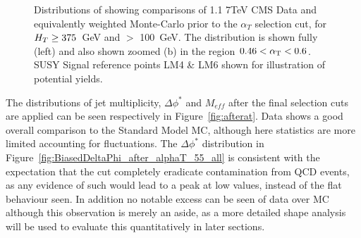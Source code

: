 \begin{figure}[htpb]
\centering
\begin{minipage}[b]{1.\textwidth}
\centering
{}
\hspace{0.2cm}
     \end{minipage}
    \caption{\label{fig:preselplotb}Distributions of \alt showing comparisons of 1.1  7TeV CMS Data and equivalently weighted Monte-Carlo prior to the $\alpha_{T}$ selection cut, for $H_{T}  \geq 375$~GeV and \MHT $>$ 100~GeV. The \alt distribution is shown fully (left) and also shown zoomed (b) in the region $0.46 < \alpha_{\text{T}} < 0.6$. SUSY Signal reference points LM4 \& LM6 shown for illustration of potential yields.}
\end{figure}


The distributions of jet multiplicity, $\Delta \phi^{*}$ and $M_{eff}$ after the final selection cuts are applied can be seen respectively in Figure~\ref{fig:afterat}. Data shows a good overall comparison to the Standard Model MC, although here statistics are more limited accounting for fluctuations. The $\Delta \phi^{*}$ distribution in Figure~\ref{fig:BiasedDeltaPhi_after_alphaT_55_all} is consistent with the expectation that the \alt cut completely eradicate contamination from QCD events, as any evidence of such would lead to a peak at low values, instead of the flat behaviour seen. In addition no notable excess can be seen of data over MC although this observation is merely an aside, as a more detailed shape analysis will be used to evaluate this quantitatively in later sections. 

